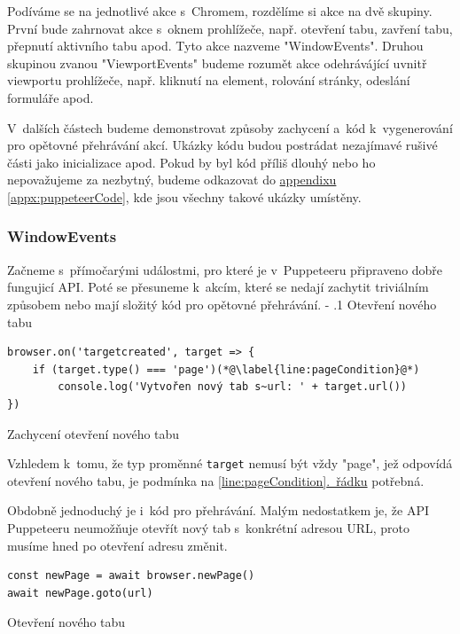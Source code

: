 \documentclass[12pt, a4paper, twoside]{article}
\makeatletter
\newcommand{\codefigureSpacing}{1.2}
\newcommand{\refAddedText}[3]{\hyperref[#1]{#2\ref{#1}#3}}
\newcommand{\lineref}[2]{\refAddedText{#1}{}{.~#2}}
\renewcommand\paragraph{%
	\@startsection{subparagraph}{5}{0mm}%
	{-\baselineskip}%
	{.1\baselineskip}%
	{\normalfont\normalsize\bfseries}}
\makeatother
\begin{document}
	Podíváme se na jednotlivé akce s~Chromem, rozdělíme si akce na dvě skupiny. První bude zahrnovat akce s~oknem prohlížeče, např. otevření tabu, zavření tabu, přepnutí aktivního tabu apod. Tyto akce nazveme "WindowEvents". Druhou skupinou zvanou "ViewportEvents" budeme rozumět akce odehrávájící uvnitř viewportu prohlížeče, např. kliknutí na element, rolování stránky, odeslání formuláře apod.
	
	V~dalších částech budeme demonstrovat způsoby zachycení a~kód k~vygenerování pro opětovné přehrávání akcí. Ukázky kódu budou postrádat nezajímavé rušivé části jako inicializace apod. Pokud by byl kód příliš dlouhý nebo ho nepovažujeme za nezbytný, budeme odkazovat do \refAddedText{appx:puppeteerCode}{appendixu }{}, kde jsou všechny takové ukázky umístěny.
	\subsubsection{WindowEvents}
	Začneme s~přímočarými událostmi, pro které je v~Puppeteeru připraveno dobře fungujicí API. Poté se přesuneme k~akcím, které se nedají zachytit triviálním způsobem nebo mají složitý kód pro opětovné přehrávání.
	\paragraph{Otevření nového tabu}
	\begin{codefigure}[H]
		\renewcommand\baselinestretch{\codefigureSpacing}
		\begin{lstlisting}[style=MyJavaScript]
browser.on('targetcreated', target => {
	if (target.type() === 'page')(*@\label{line:pageCondition}@*)
		console.log('Vytvořen nový tab s~url: ' + target.url())
})
		\end{lstlisting}
	\caption{Zachycení otevření nového tabu}
	\label{codefig:openNewTab}
	\end{codefigure}
	Vzhledem k~tomu, že typ proměnné \texttt{target} nemusí být vždy "page", jež odpovídá otevření nového tabu, je podmínka na \lineref{line:pageCondition}{řádku} potřebná.
	
	Obdobně jednoduchý je i~kód pro přehrávání. Malým nedostatkem je, že API Puppeteeru neumožňuje otevřít nový tab s~konkrétní adresou URL, proto musíme hned po otevření adresu změnit.
	\begin{codefigure}[H]
		\renewcommand\baselinestretch{\codefigureSpacing}
		\begin{lstlisting}[style=MyJavaScript]
const newPage = await browser.newPage()
await newPage.goto(url)
		\end{lstlisting}
	\caption{Otevření nového tabu}
	\end{codefigure}
	\newpage
\end{document}
